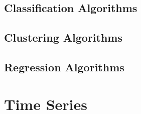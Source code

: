 \subsection{Classification Algorithms}\label{sec:classification}

\subsection{Clustering Algorithms}\label{sec:clust}

\subsection{Regression Algorithms}\label{sec:regr}

\section{Time Series}\label{sec:timeseries}
